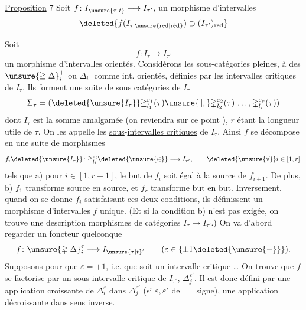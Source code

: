 \uline{Proposition} 7 Soit $f\colon I_{\unsure{\tau|t}}\longrightarrow I_{\tau'}$, un morphisme
d'intervalles   
\[
\deleted{f(I_{\tau\,\unsure{\mathrm{red}|\mathrm{r\acute ed}}})\supset(I_{\tau'})_{\mathrm{red}}}
\]

Soit
\[
 f\colon I_\tau\longrightarrow I_{\tau'}
\]
un morphisme d'intervalles orientés. 
Considérons les sous-catégories pleines, 
à des $\unsure{\mathbb{\Delta}|\Delta}_i^+$ ou $\mathbb{\Delta}_i^-$ comme int. orientés,
 définies par les intervalles critiques de
$I_\tau$. Ils forment une suite \inserted{$\Sigma_\tau$} de sous catégories
de $I_\tau$
\[
 \Sigma_\tau=(\deleted{\unsure{I_{\tau}}}\mathbb{\Delta}_{l_1}^{\varepsilon_1}(\tau)\unsure{\,|,}
 \mathbb{\Delta}_{l_2}^{\varepsilon_2}(\tau)\,\ldots,\mathbb{\Delta}_{l_r}^{\varepsilon_r}(\tau))
\]
dont $I_\tau$ est la somme amalgamée (on reviendra
sur ce point ), $r$ étant la longueur utile de
$\tau$. On les appelle les \uline{sous}-\uline{intervalles
critiques} de $I_\tau$. Ainsi $f$ se décompose en
une suite de morphismes
\[
 f_i\deleted{\unsure{I_\tau}}\colon\mathbb{\Delta}_{l_i}^{\varepsilon_i}\deleted{\unsure{\in}}
 \longrightarrow I_{\tau'},\qquad \deleted{\unsure{\forall}}i\in[1,r],
\]
tels que a) pour $i\in[1,r-1]$, le but de $f_i$
soit égal à la source de $f_{i+1}$.  De
plus, b) $f_1$ transforme source en source, et $f_r$ transforme
but en but.  Inversement, quand
on se donne  $f_i$ satisfaisant ces deux conditions,
ils définissent un morphisme d'intervalles $f$
unique. (Et si la condition b) n'est pas 
exigée, on trouve une description  morphismes
de catégories $I_\tau\longrightarrow I_{\tau'}$.)
On va d'abord regarder un foncteur quelconque
\[
 f\colon \unsure{\mathbb{\Delta}|\Delta}_i^\varepsilon\longrightarrow I_{\unsure{\tau|t}'}
 \qquad(\varepsilon\in\{\pm1\deleted{\unsure{-}}\}).
\]
Supposons pour   que $\varepsilon=+1$, i.e. que 
 soit un intervalle  critique
\ldots{} On trouve que $f$  se factorise
par un sous-intervalle critique de $I_{\tau'}$,
 $\mathbb{\Delta}_j^{\varepsilon'}$.
Il est donc défini par une application
croissante de $\Delta_i^\varepsilon$ dans $\Delta_j^{\varepsilon'}$ (si $\varepsilon,\varepsilon'$ de $=$ signe),
une application décroissante dans  sens inverse.

